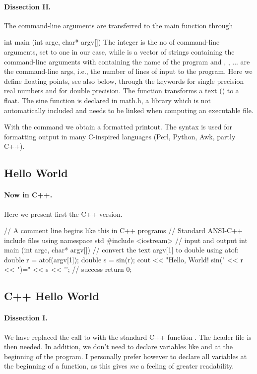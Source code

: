 \documentclass[%
twoside,                 %
final,                   %
10pt]{article}
\newenvironment{paragraphadmon}[1][]{\paragraph{#1}}{}
\begin{document}
\begin{paragraphadmon}[Dissection II.]
The command-line arguments are transferred to the main function through

\bcppcod
   int main (int argc, char* argv[])
\ecppcod
The integer  is the no of command-line arguments, set to
one in our case, while
 is a vector of strings containing the command-line arguments
with  containing  the name of the program
and , , ... are the command-line args, i.e., the number of
lines of input to the program.
Here we define floating points, see also below,
through the keywords  for single precision real numbers and
 for double precision. The function
 transforms a text () to a float.
The sine function is declared in math.h, a library which
is not automatically included and needs to be linked when computing
an executable file.

With the command  we obtain a formatted printout.
The  syntax is used for formatting output
in many C-inspired languages (Perl, Python, Awk, partly C++).
\end{paragraphadmon}



\subsection{Hello World}


\begin{paragraphadmon}[Now in C++.]
Here we present first the C++ version.

\bcpppro
// A comment line begins like this in C++ programs
// Standard ANSI-C++ include files
using namespace std
#include <iostream>  // input and output
int main (int argc, char* argv[])
{
  // convert the text argv[1] to double using atof:
  double r = atof(argv[1]);
  double s = sin(r);
  cout << "Hello, World! sin(" << r << ")=" << s << '\n';
  // success
  return 0;
}
\ecpppro
\end{paragraphadmon}



\subsection{C++ Hello World}


\begin{paragraphadmon}[Dissection I.]
We have replaced the call to  with the standard C++ function
. The header file  is then needed.
In addition, we don't need to
declare variables like  and   at the beginning of the program.
I personally prefer
however to declare all variables at the beginning of a function, as this
gives \emph{me} a feeling of greater readability.
\end{paragraphadmon}
\end{document}
